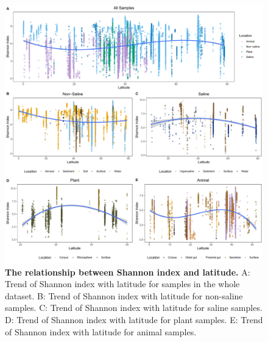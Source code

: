 \begin{figure}[H]
    \centering
    \includegraphics[scale=0.33]{./Figures/Shan_lati_empo2}
    \caption{\textbf{The relationship between Shannon index and latitude.} A: Trend of Shannon index with latitude for samples in the whole dataset. B: Trend of Shannon index with latitude for non-saline samples. C: Trend of Shannon index with latitude for saline samples. D: Trend of Shannon index with latitude for plant samples. E: Trend of Shannon index with latitude for animal samples.}
    \label{fig:Shan_lati}
\end{figure}

